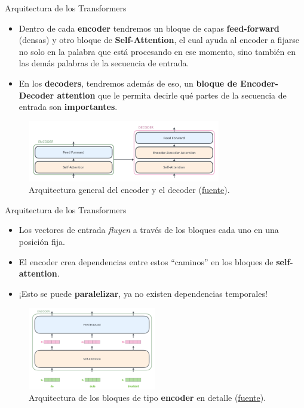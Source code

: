 \begin{frame}{Arquitectura de los Transformers}
\begin{itemize}
    \item Dentro de cada \textbf{encoder} tendremos un bloque de capas \textbf{feed-forward} (densas) y otro bloque de \textbf{Self-Attention}, el cual ayuda al encoder a fijarse no solo en la palabra que está procesando en ese momento, sino también en las demás palabras de la secuencia de entrada.
    \item En los \textbf{decoders}, tendremos además de eso, un \textbf{bloque de Encoder-Decoder attention} que le permita decirle qué partes de la secuencia de entrada son \textbf{importantes}.
\end{itemize}

\begin{figure}
    \centering
    \includegraphics[width=0.75\textwidth]{Slides/figures/02_Metodos_Generativos/trans-arch6.png}
    \caption{Arquitectura general del encoder y el decoder (\href{http://jalammar.github.io/illustrated-transformer/}{fuente}).}
\end{figure}
\end{frame}


\begin{frame}{Arquitectura de los Transformers}
\begin{itemize}
    \item Los vectores de  entrada \textit{fluyen} a través de los bloques cada uno en una posición fija. \item El encoder crea dependencias entre estos ``caminos'' en los bloques de \textbf{self-attention}.
    \item ¡Esto se puede \textbf{paralelizar}, ya no existen dependencias temporales!
\end{itemize}

\begin{figure}
    \centering
    \includegraphics[width=0.5\textwidth]{Slides/figures/02_Metodos_Generativos/trans-arch7.png}
    \caption{Arquitectura de los bloques de tipo \textbf{encoder} en detalle (\href{http://jalammar.github.io/illustrated-transformer/}{fuente}).}
\end{figure}
\end{frame}

